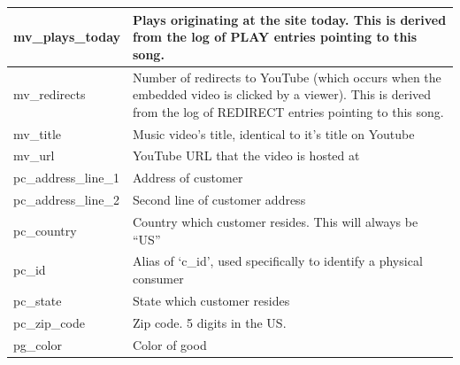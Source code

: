 \documentclass[11pt, a4paper]{report}
\begin{document}
\begin{longtable}{|l|p{10cm}|}
mv\_plays\_today        & Plays originating at the site today. This is derived from the log of PLAY entries pointing to this song.                                                              \\ \hline
mv\_redirects           & Number of redirects to YouTube (which occurs when the embedded video is clicked by a viewer). This is derived from the log of REDIRECT entries pointing to this song. \\ \hline
mv\_title               & Music video’s title, identical to it’s title on Youtube                                                                                                               \\ \hline
mv\_url                 & YouTube URL that the video is hosted at                                                                                                                               \\ \hline
pc\_address\_line\_1    & Address of customer                                                                                                                                                   \\ \hline
pc\_address\_line\_2    & Second line of customer address                                                                                                                                       \\ \hline
pc\_country             & Country which customer resides. This will always be ``US''                                                                                                              \\ \hline
pc\_id                  & Alias of `c\_id', used specifically to identify a physical consumer                                                                                                    \\ \hline
pc\_state               & State which customer resides                                                                                                                                          \\ \hline
pc\_zip\_code           & Zip code. 5 digits in the US.                                                                                                                                         \\ \hline
pg\_color               & Color of good                                                                                                                                                         \\ \hline

\end{longtable}
\end{document}

